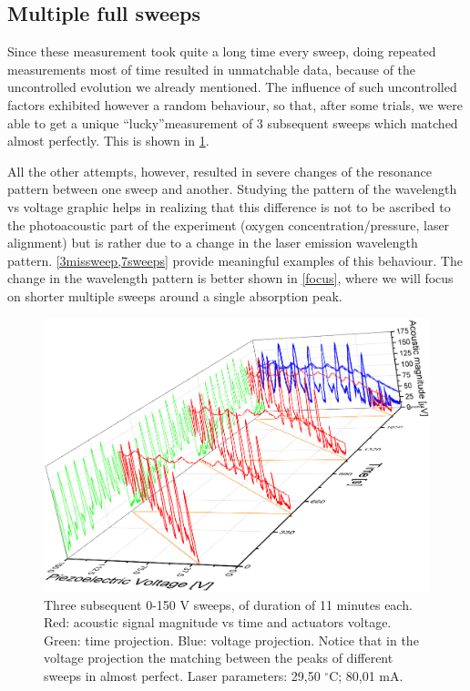 		\subsection{Multiple full sweeps}
Since these measurement took quite a long time every sweep, doing repeated measurements most of time resulted in unmatchable data, because of the uncontrolled evolution we already mentioned. The influence of such uncontrolled factors exhibited however a random behaviour, so that, after some trials, we were able to get a unique \textquotedblleft lucky\textquotedblright measurement of 3 subsequent sweeps which matched almost perfectly. This is shown in \cref{3sweep}.

All the other attempts, however, resulted in severe changes of the resonance pattern between one sweep and another. Studying the pattern of the wavelength vs voltage graphic helps in realizing that this difference is not to be ascribed to the photoacoustic part of the experiment (oxygen concentration/pressure, laser alignment) but is rather due to a change in the laser emission wavelength pattern. \cref{3missweep,7sweeps} provide meaningful examples of this behaviour.
The change in the wavelength pattern is better shown in \cref{focus}, where we will focus
on shorter multiple sweeps around a single absorption peak.
\begin{landscape}
\begin{figure}[!bhtp]\centering
\includegraphics[height=\textheight, draft=\foto]{eps/3sweepsmatching.eps}
\caption{Three subsequent 0-150 V sweeps, of duration of 11 minutes each. Red: acoustic signal magnitude vs time and actuators voltage. Green: time projection. Blue: voltage projection. Notice that in the voltage projection the matching between the peaks of different sweeps in almost perfect. Laser parameters: 29,50 $^\circ$C; 80,01 mA.}
\label{3sweep}
\end{figure}\vfill
\end{landscape}

